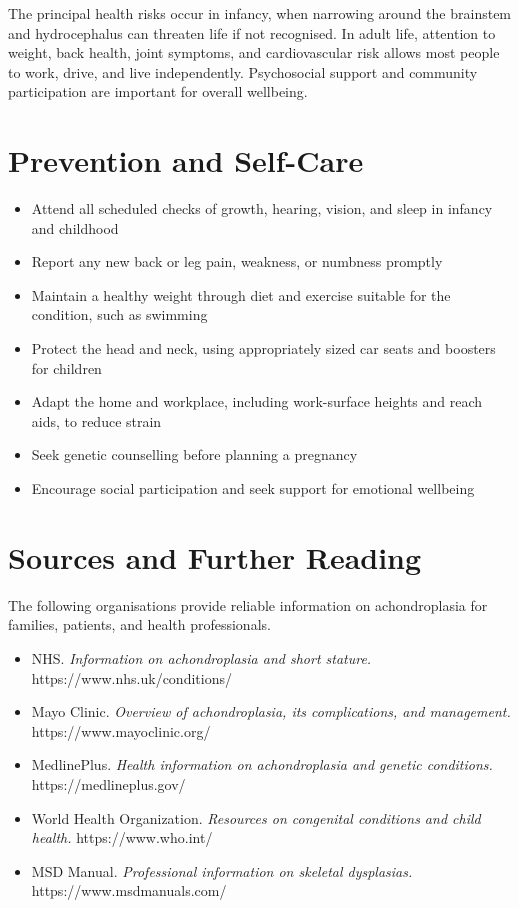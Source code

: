 The principal health risks occur in infancy, when narrowing around the brainstem and hydrocephalus can threaten life if not recognised. In adult life, attention to weight, back health, joint symptoms, and cardiovascular risk allows most people to work, drive, and live independently. Psychosocial support and community participation are important for overall wellbeing.

\section*{Prevention and Self-Care}
\begin{itemize}
    \item Attend all scheduled checks of growth, hearing, vision, and sleep in infancy and childhood
    \item Report any new back or leg pain, weakness, or numbness promptly
    \item Maintain a healthy weight through diet and exercise suitable for the condition, such as swimming
    \item Protect the head and neck, using appropriately sized car seats and boosters for children
    \item Adapt the home and workplace, including work-surface heights and reach aids, to reduce strain
    \item Seek genetic counselling before planning a pregnancy
    \item Encourage social participation and seek support for emotional wellbeing
\end{itemize}

\section*{Sources and Further Reading}
The following organisations provide reliable information on achondroplasia for families, patients, and health professionals.

\begin{itemize}
    \item NHS. \textit{Information on achondroplasia and short stature.} https://www.nhs.uk/conditions/
    \item Mayo Clinic. \textit{Overview of achondroplasia, its complications, and management.} https://www.mayoclinic.org/
    \item MedlinePlus. \textit{Health information on achondroplasia and genetic conditions.} https://medlineplus.gov/
    \item World Health Organization. \textit{Resources on congenital conditions and child health.} https://www.who.int/
    \item MSD Manual. \textit{Professional information on skeletal dysplasias.} https://www.msdmanuals.com/
\end{itemize}
